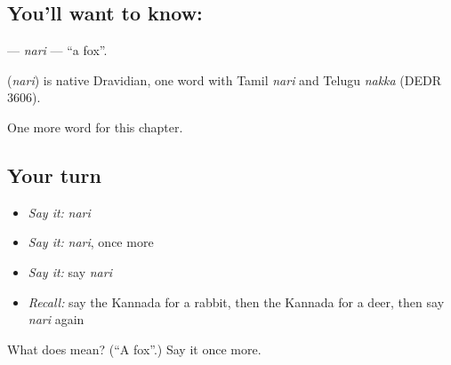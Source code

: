 \subsection*{You'll want to know: }
\textbf{} — \emph{nari} — \textquotedblleft{}a fox\textquotedblright{}.

\begin{cousinweb}
\textbf{} (\emph{nari}) is native Dravidian, one word with Tamil \emph{nari} and Telugu \emph{nakka} (DEDR 3606).
\end{cousinweb}

\begin{grammarlens}[title={What you've built}]
One more word for this chapter.
\end{grammarlens}

\subsection*{Your turn}
\begin{itemize}
\raggedright
  \item \emph{Say it:} \emph{nari}
  \item \emph{Say it:} \emph{nari}, once more
  \item \emph{Say it:} say \emph{nari}
  \item \emph{Recall:} say the Kannada for a rabbit, then the Kannada for a deer, then say \emph{nari} again
\end{itemize}

\begin{tcolorbox}[breakable,colback=teal!4,colframe=teal!35!black,title={Before you move on}]
What does  mean? (\textquotedblleft{}A fox\textquotedblright{}.) Say it once more.
\end{tcolorbox}
